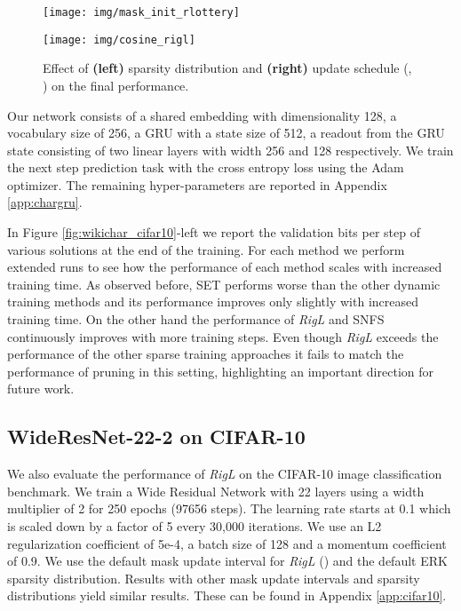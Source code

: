 \documentclass{article}
\begin{document}
\begin{figure*}[b]
\centering
\begin{minipage}{.5\textwidth}
  \centering
  \texttt{[image: img/mask\_init\_rlottery]}
\end{minipage}\begin{minipage}{.5\textwidth}
  \centering
  \texttt{[image: img/cosine\_rigl]}
\end{minipage}
\vskip -0.05in
\caption{Effect of \textbf{(left)} sparsity distribution and \textbf{(right)} update schedule (, ) on the final performance.  }
\label{fig:ablation}
\end{figure*}

Our network consists of a shared embedding with dimensionality 128, a vocabulary size of 256, a GRU with a state size of 512, a readout from the GRU state consisting of two linear layers with width 256 and 128 respectively.  We train the next step prediction task with the cross entropy loss using the Adam optimizer. The remaining hyper-parameters are reported in Appendix \ref{app:chargru}.


In Figure \ref{fig:wikichar_cifar10}-left we report the validation bits per step of various solutions at the end of the training. For each method we perform extended runs to see how the performance of each method scales with increased training time. As observed before, SET performs worse than the other dynamic training methods and its performance improves only slightly with increased training time. On the other hand the performance of {\em RigL} and SNFS continuously improves with more training steps. Even though {\em RigL} exceeds the performance of the other sparse training approaches it fails to match the performance of pruning in this setting, highlighting an important direction for future work.

\subsection{WideResNet-22-2 on CIFAR-10}
\label{sec:cifar10}
We also evaluate the performance of {\em RigL} on the CIFAR-10 image classification benchmark. We train a Wide Residual Network \citep{wideresnet} with 22 layers using a width multiplier of 2 for 250 epochs (97656 steps). The learning rate starts at 0.1 which is scaled down by a factor of 5 every 30,000 iterations. We use an L2 regularization coefficient of 5e-4, a batch size of 128 and a momentum coefficient of 0.9. We use the default mask update interval for {\em RigL} () and the default ERK sparsity distribution. Results with other mask update intervals and sparsity distributions yield similar results. These can be found in Appendix \ref{app:cifar10}.
\end{document}
